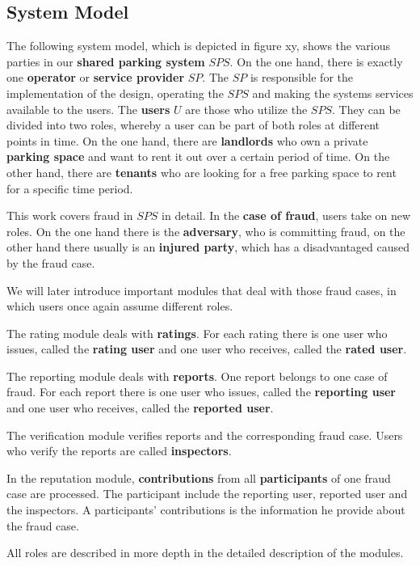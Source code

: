 \documentclass[
a4paper,     %
titlepage,   %
14pt         %
]{scrartcl}  %
\theoremstyle{mystyle}
\begin{document}
\subsection{System Model}
The following system model, which is depicted in figure xy, shows the various parties in our \textbf{shared parking system} $SPS$. On the one hand, there is exactly one \textbf{operator} or \textbf{service provider} $SP$. The $SP$ is responsible for the implementation of the design, operating the $SPS$ and making the systems services available to the users. The \textbf{users} $U$ are those who utilize the $SPS$. They can be divided into two roles, whereby a user can be part of both roles at different points in time. On the one hand, there are \textbf{landlords} who own a private \textbf{parking space} and want to rent it out over a certain period of time. On the other hand, there are \textbf{tenants} who are looking for a free parking space to rent for a specific time period.

This work covers fraud in $SPS$ in detail. In the \textbf{case of fraud}, users take on new roles. On the one hand there is the \textbf{adversary}, who is committing fraud, on the other hand there usually is an \textbf{injured party}, which has a disadvantaged caused by the fraud case.

We will later introduce important modules that deal with those fraud cases, in which users once again assume different roles.

The rating module deals with \textbf{ratings}. For each rating there is one user who issues, called the\textbf{ rating user} and one user who receives, called the \textbf{rated user}.

The reporting module deals with \textbf{reports}. One report belongs to one case of fraud. For each report there is one user who issues, called the \textbf{reporting user} and one user who receives, called the \textbf{reported user}.

The verification module verifies reports and the corresponding fraud case. Users who verify the reports are called \textbf{inspectors}.

In the reputation module, \textbf{contributions} from all \textbf{participants} of one fraud case are processed. The participant include the reporting user, reported user and the inspectors. A participants' contributions is the information he provide about the fraud case.

All roles are described in more depth in the detailed description of the modules.\\
\end{document}
